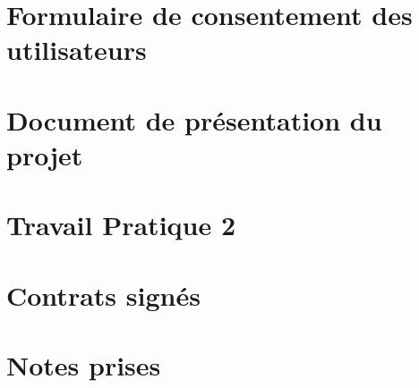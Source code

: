 \documentclass[letterpaper, oneside, 12pt, these, creativecommons]{thETS}
\begin{document}
\appendix
\multiannexe

\chapter{Formulaire de consentement des utilisateurs}



\chapter{Document de présentation du projet}



\chapter{Travail Pratique 2}

%

\chapter{Contrats signés}









\chapter{Notes prises}










\end{document}
